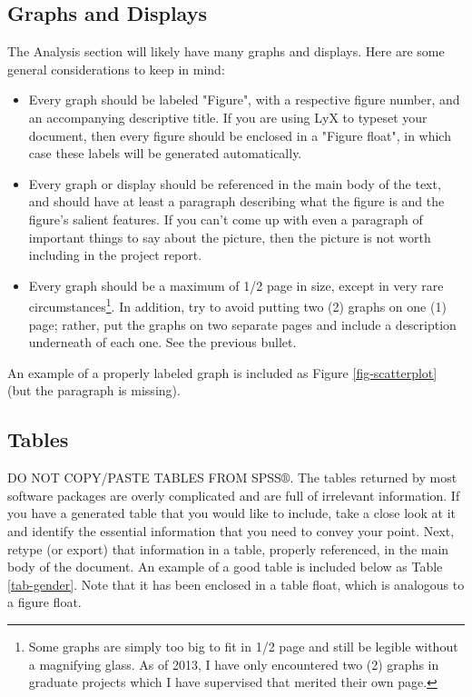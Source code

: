 \documentclass[11pt]{article}
\begin{document}
\subsection[Graphs and Displays]{Graphs and Displays}
\label{sec-4-1}

The Analysis section will likely have many graphs and displays. 
Here are some general considerations to keep in mind:

\begin{itemize}
\item Every graph should be labeled "Figure", with a respective figure
number, and an accompanying descriptive title. If you are using LyX
to typeset your document, then every figure should be enclosed in a
"Figure float", in which case these labels will be generated
automatically.
\item Every graph or display should be referenced in the main body of the
text, and should have at least a paragraph describing what the
figure is and the figure's salient features. If you can't come up
with even a paragraph of important things to say about the picture,
then the picture is not worth including in the project report.
\item Every graph should be a maximum of 1/2 page in size, except in very
rare circumstances\footnote{Some graphs are simply too big to fit in 1/2 page and still be
legible without a magnifying glass. As of 2013, I have only
encountered two (2) graphs in graduate projects which I have supervised
that merited their own page.}. In addition, try to avoid putting two (2) graphs
on one (1) page; rather, put the graphs on two separate pages and
include a description underneath of each one. See the previous
bullet.
\end{itemize}

An example of a properly labeled graph is included as Figure \ref{fig-scatterplot} (but the paragraph is missing).
\subsection[Tables]{Tables}
\label{sec-4-2}

DO NOT COPY/PASTE TABLES FROM SPSS\(\circledR\). The tables returned
by most software packages are overly complicated and are full of
irrelevant information. If you have a generated table that you would
like to include, take a close look at it and identify the essential
information that you need to convey your point. Next, retype (or
export) that information in a table, properly referenced, in the main
body of the document. An example of a good table is included below as
Table \ref{tab-gender}.  Note that it has been enclosed in a table float,
which is analogous to a figure float.
\end{document}
